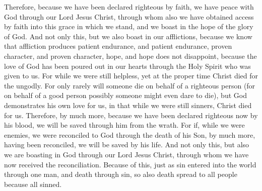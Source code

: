 \begin{biblechapter} %
 Therefore, because we have been declared righteous by faith, we have peace with God through our Lord Jesus Christ,
\verse through whom also we have obtained access by faith into this grace in which we stand, and we boast in the hope of the glory of God.
\verse And not only this, but we also boast in our afflictions, because we know that affliction produces patient endurance,
\verse and patient endurance, proven character, and proven character, hope,
\verse and hope does not disappoint, because the love of God has been poured out in our hearts through the Holy Spirit who was given to us.
\verse For while we were still helpless, yet at the proper time Christ died for the ungodly.
\verse For only rarely will someone die on behalf of a righteous person (for on behalf of a good person possibly someone might even dare to die),
\verse but God demonstrates his own love for us, in that while we were still sinners, Christ died for us.
\verse Therefore, by much more, because we have been declared righteous now by his blood, we will be saved through him from the wrath.
\verse For if, while we were enemies, we were reconciled to God through the death of his Son, by much more, having been reconciled, we will be saved by his life.
\verse And not only this, but also we are boasting in God through our Lord Jesus Christ, through whom we have now received the reconciliation.
 Because of this, just as sin entered into the world through one man, and death through sin, so also death spread to all people because all sinned.

\end{biblechapter}

